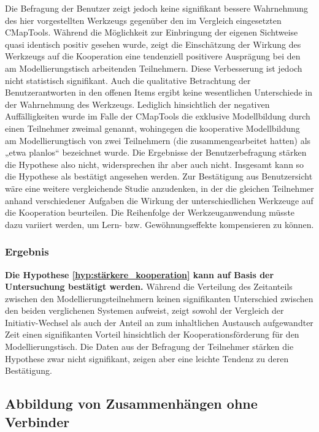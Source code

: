 Die Befragung der Benutzer zeigt jedoch keine signifikant bessere Wahrnehmung des hier vorgestellten Werkzeugs gegenüber den im Vergleich eingesetzten CMapTools. Während die Möglichkeit zur Einbringung der eigenen Sichtweise quasi identisch positiv gesehen wurde, zeigt die Einschätzung der Wirkung des Werkzeugs auf die Kooperation eine tendenziell positivere Ausprägung bei den am Modellierungstisch arbeitenden Teilnehmern. Diese Verbesserung ist jedoch nicht statistisch signifikant. Auch die qualitative Betrachtung der Benutzerantworten in den offenen Items ergibt keine wesentlichen Unterschiede in der Wahrnehmung des Werkzeugs. Lediglich hinsichtlich der negativen Auffälligkeiten wurde im Falle der CMapTools die exklusive Modellbildung durch einen Teilnehmer zweimal genannt, wohingegen die kooperative Modellbildung am Modellierungtisch von zwei Teilnehmern (die zusammengearbeitet hatten) als „etwa planlos“ bezeichnet wurde. Die Ergebnisse der Benutzerbefragung stärken die Hypothese also nicht, widersprechen ihr aber auch nicht. Insgesamt kann so die Hypothese als bestätigt angesehen werden. Zur Bestätigung aus Benutzersicht wäre eine weitere vergleichende Studie anzudenken, in der die gleichen Teilnehmer anhand verschiedener Aufgaben die Wirkung der unterschiedlichen Werkzeuge auf die Kooperation beurteilen. Die Reihenfolge der Werkzeuganwendung müsste dazu variiert werden, um Lern- bzw. Gewöhnungseffekte kompensieren zu können.

\subsubsection{Ergebnis} %

\textbf{Die Hypothese \ref{hyp:stärkere_kooperation} kann auf Basis der Untersuchung bestätigt werden.} Während die Verteilung des Zeitanteils zwischen den Modellierungsteilnehmern keinen signifikanten Unterschied zwischen den beiden verglichenen Systemen aufweist, zeigt sowohl der Vergleich der Initiativ-Wechsel als auch der Anteil an zum inhaltlichen Austausch aufgewandter Zeit einen signifikanten Vorteil hinsichtlich der Kooperationsförderung für den Modellierungstisch. Die Daten aus der Befragung der Teilnehmer stärken die Hypothese zwar nicht signifikant, zeigen aber eine leichte Tendenz zu deren Bestätigung. 


\subsection{Abbildung von Zusammenhängen ohne Verbinder} %
\label{sub:abbildung_von_zusammenhängen_ohne_verbinder}

